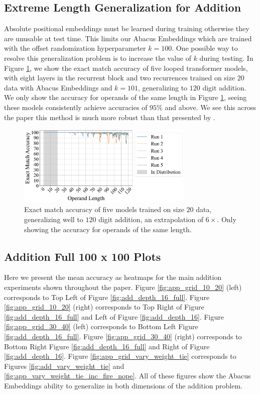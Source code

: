 \documentclass{article}
\begin{document}
\subsection{Extreme Length Generalization for Addition}
\label{app-subsubsec:extreme_gen}
Absolute positional embeddings must be learned during training otherwise they are unusable at test time.
This limits our Abacus Embeddings which are trained with the offset randomization hyperparameter \(k=100\).
One possible way to resolve this generalization problem is to increase the value of \(k\) during testing.
In Figure \ref{fig:extreme-gen}, we show the exact match accuracy of five looped transformer models, with eight layers in the recurrent block and two recurrences trained on size \(20\) data with Abacus Embeddings and \(k=101\), generalizing to \(120\) digit addition.
We only show the accuracy for operands of the same length in Figure \ref{fig:extreme-gen}, seeing these models consistently achieve accuracies of \(95\%\) and above.
We see this across the paper this method is much more robust than that presented by \citet{zhou2024transformers}.

\begin{figure}[ht!]
    \centering
    \includegraphics[width=0.75\textwidth]{Figures/plot_17_101.pdf}
    \caption{
    Exact match accuracy of five models trained on size \(20\) data, generalizing well to \(120\) digit addition, an extrapolation of \(6\times\).
    Only showing the accuracy for operands of the same length.
    }
    \label{fig:extreme-gen}
\end{figure}

\subsection{Addition Full 100 x 100 Plots}
\label{app-subsec:grid-plots}
Here we present the mean accuracy as heatmaps for the main addition experiments shown throughout the paper.
Figure \ref{fig:app_grid_10_20} (left) corresponds to Top Left of Figure \ref{fig:add_depth_16_full}.
Figure \ref{fig:app_grid_10_20} (right) corresponds to Top Right of Figure \ref{fig:add_depth_16_full} and Left of Figure \ref{fig:add_depth_16}.
Figure \ref{fig:app_grid_30_40} (left) corresponds to Bottom Left Figure \ref{fig:add_depth_16_full}.
Figure \ref{fig:app_grid_30_40} (right) corresponds to Bottom Right Figure \ref{fig:add_depth_16_full} and Right of Figure \ref{fig:add_depth_16}.
Figure \ref{fig:app_grid_vary_weight_tie} corresponds to Figures \ref{fig:add_vary_weight_tie} and \ref{fig:app_vary_weight_tie_inc_fire_nope}.
All of these figures show the Abacus Embeddings ability to generalize in both dimensions of the addition problem.
\end{document}
